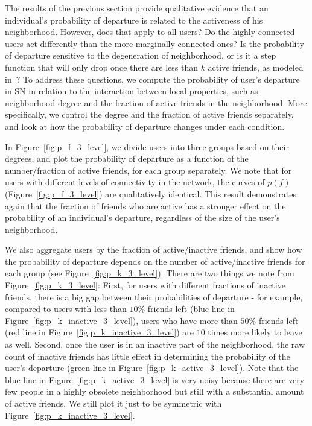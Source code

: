 \documentclass[phd,tocprelim]{cornell}
\begin{document}
The results of the previous section provide qualitative evidence that an individual's probability of departure is related to the activeness of his neighborhood.  
However, does that apply to all users? Do the highly connected users act differently than the more marginally connected ones? Is the probability of departure sensitive to the degeneration of neighborhood, or is it a step function that will only drop once there are less than $k$ active friends, as modeled in~\cite{Bhawalkar:2012}? 
To address these questions, we compute the probability of user's departure in SN in relation to the interaction between local properties, such as neighborhood degree and the fraction of active friends in the neighborhood. More specifically, we control the degree and the fraction of active friends separately, and look at how the probability of departure changes under each condition. 

In Figure~\ref{fig:p_f_3_level}, we divide users into three groups based on their degrees, and plot the probability of departure as a function of the number/fraction of active friends, for each group separately. We note that for users with different levels of connectivity in the network, the curves of $p(f)$ (Figure~\ref{fig:p_f_3_level}) are qualitatively identical. This result demonstrates again that the fraction of friends who are active has a stronger effect on the probability of an individual's departure, regardless of the size of the user's neighborhood.

We also aggregate users by the fraction of active/inactive friends, and show how the probability of departure depends on the number of active/inactive friends for each group (see Figure~\ref{fig:p_k_3_level}). There are two things we note from Figure~\ref{fig:p_k_3_level}: First, for users with different fractions of inactive friends, there is a big gap between their probabilities of departure - for example, compared to users with less than $10\%$ friends left (blue line in Figure~\ref{fig:p_k_inactive_3_level}), users who have more than $50\%$ friends left (red line in Figure~\ref{fig:p_k_inactive_3_level}) are $10$ times more likely to leave as well. Second, once the user is in an inactive part of the neighborhood, the raw count of inactive friends has little effect in determining the probability of the user's departure (green line in Figure~\ref{fig:p_k_active_3_level}). Note that the blue line in Figure~\ref{fig:p_k_active_3_level} is very noisy because there are very few people in a highly obsolete neighborhood but still with a substantial amount of active friends. We still plot it just to be symmetric with Figure~\ref{fig:p_k_inactive_3_level}.
\end{document}
